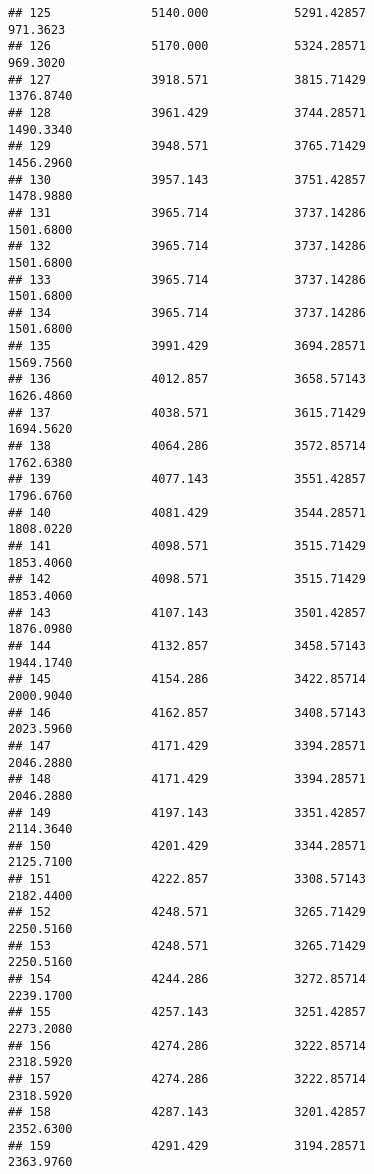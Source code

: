 \documentclass[]{article}
\begin{document}
\begin{verbatim}
## 125              5140.000            5291.42857                 971.3623
## 126              5170.000            5324.28571                 969.3020
## 127              3918.571            3815.71429                1376.8740
## 128              3961.429            3744.28571                1490.3340
## 129              3948.571            3765.71429                1456.2960
## 130              3957.143            3751.42857                1478.9880
## 131              3965.714            3737.14286                1501.6800
## 132              3965.714            3737.14286                1501.6800
## 133              3965.714            3737.14286                1501.6800
## 134              3965.714            3737.14286                1501.6800
## 135              3991.429            3694.28571                1569.7560
## 136              4012.857            3658.57143                1626.4860
## 137              4038.571            3615.71429                1694.5620
## 138              4064.286            3572.85714                1762.6380
## 139              4077.143            3551.42857                1796.6760
## 140              4081.429            3544.28571                1808.0220
## 141              4098.571            3515.71429                1853.4060
## 142              4098.571            3515.71429                1853.4060
## 143              4107.143            3501.42857                1876.0980
## 144              4132.857            3458.57143                1944.1740
## 145              4154.286            3422.85714                2000.9040
## 146              4162.857            3408.57143                2023.5960
## 147              4171.429            3394.28571                2046.2880
## 148              4171.429            3394.28571                2046.2880
## 149              4197.143            3351.42857                2114.3640
## 150              4201.429            3344.28571                2125.7100
## 151              4222.857            3308.57143                2182.4400
## 152              4248.571            3265.71429                2250.5160
## 153              4248.571            3265.71429                2250.5160
## 154              4244.286            3272.85714                2239.1700
## 155              4257.143            3251.42857                2273.2080
## 156              4274.286            3222.85714                2318.5920
## 157              4274.286            3222.85714                2318.5920
## 158              4287.143            3201.42857                2352.6300
## 159              4291.429            3194.28571                2363.9760

\end{verbatim}
\end{document}
